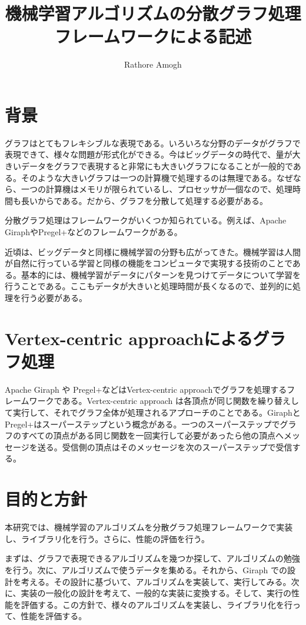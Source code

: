 \documentclass[]{iplresume} %
\title{機械学習アルゴリズムの分散グラフ処理フレームワークによる記述}
\author{Rathore Amogh}
\begin{document}
\maketitle
\section{背景}
グラフはとてもフレキシブルな表現である。いろいろな分野のデータがグラフで表現できて、様々な問題が形式化ができる。今はビッグデータの時代で、量が大きいデータをグラフで表現すると非常にも大きいグラフになることが一般的である。そのような大きいグラフは一つの計算機で処理するのは無理である。なぜなら、一つの計算機はメモリが限られているし、プロセッサが一個なので、処理時間も長いからである。だから、グラフを分散して処理する必要がある。

分散グラフ処理はフレームワークがいくつか知られている。例えば、Apache GiraphやPregel+などのフレームワークがある。

近頃は、ビッグデータと同様に機械学習の分野も広がってきた。機械学習は人間が自然に行っている学習と同様の機能をコンピュータで実現する技術のことである。基本的には、機械学習がデータにパターンを見つけてデータについて学習を行うことである。ここもデータが大きいと処理時間が長くなるので、並列的に処理を行う必要がある。

\section{Vertex-centric approachによるグラフ処理}
Apache Giraph や Pregel+などはVertex-centric approachでグラフを処理するフレームワークである。Vertex-centric approach は各頂点が同じ関数を繰り替えして実行して、それでグラフ全体が処理されるアプローチのことである。GiraphとPregel+はスーパーステップという概念がある。一つのスーパーステップでグラフのすべての頂点がある同じ関数を一回実行して必要があったら他の頂点へメッセージを送る。受信側の頂点はそのメッセージを次のスーパーステップで受信する。

\section{目的と方針}
本研究では、機械学習のアルゴリズムを分散グラフ処理フレームワークで実装し、ライブラリ化を行う。さらに、性能の評価を行う。

まずは、グラフで表現できるアルゴリズムを幾つか探して、アルゴリズムの勉強を行う。次に、アルゴリズムで使うデータを集める。それから、Giraph での設計を考える。その設計に基づいて、アルゴリズムを実装して、実行してみる。次に、実装の一般化の設計を考えて、一般的な実装に変換する。そして、実行の性能を評価する。この方針で、様々のアルゴリズムを実装し、ライブラリ化を行って、性能を評価する。
\end{document}
